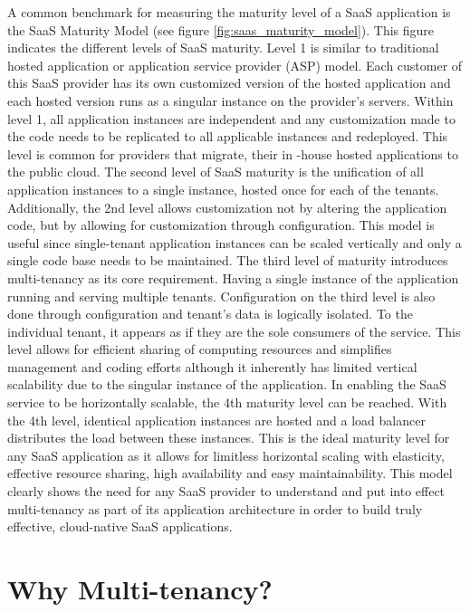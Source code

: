 A common benchmark for measuring the maturity level of a SaaS application is the SaaS Maturity Model (see figure \ref{fig:saas_maturity_model}). This figure indicates the different levels of SaaS maturity. Level 1 is similar to traditional hosted application or application service provider (ASP) model. Each customer of this SaaS provider has its own customized version of the hosted application and each hosted version runs as a singular instance on the provider's servers. Within level 1, all application instances are independent and any customization made to the code needs to be replicated to all applicable instances and redeployed. This level is common for providers that migrate, their in -house hosted applications to the public cloud. The second level of SaaS maturity is the unification of all application instances to a single instance, hosted once for each of the tenants. Additionally, the 2nd level allows customization not by altering the application code, but by allowing for customization through configuration. This model is useful since single-tenant application instances can be scaled vertically and only a single code base needs to be maintained. The third level of maturity introduces multi-tenancy as its core requirement. Having a single instance of the application running and serving multiple tenants. Configuration on the third level is also done through configuration and tenant's data is logically isolated. To the individual tenant, it appears as if they are the sole consumers of the service. This level allows for efficient sharing of computing resources and simplifies management and coding efforts although it inherently has limited vertical scalability due to the singular instance of the application. In enabling the SaaS service to be horizontally scalable, the 4th maturity level can be reached. With the 4th level, identical application instances are hosted and a load balancer distributes the load between these instances. This is the ideal maturity level for any SaaS application as it allows for limitless horizontal scaling with elasticity, effective resource sharing, high availability  and easy maintainability. This model clearly shows the need for any SaaS provider to understand and put into effect multi-tenancy as part of its application architecture in order to build truly effective, cloud-native SaaS applications.

\section{Why Multi-tenancy?}

